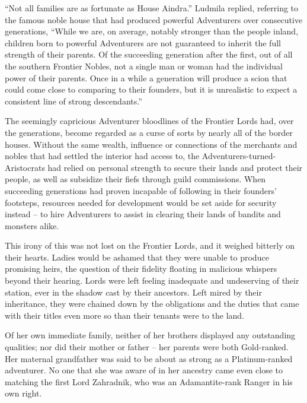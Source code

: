  

“Not all families are as fortunate as House Aindra.” Ludmila replied, referring to the famous noble house that had produced powerful Adventurers over consecutive generations, “While we are, on average, notably stronger than the people inland, children born to powerful Adventurers are not guaranteed to inherit the full strength of their parents. Of the succeeding generation after the first, out of all the southern Frontier Nobles, not a single man or woman had the individual power of their parents. Once in a while a generation will produce a scion that could come close to comparing to their founders, but it is unrealistic to expect a consistent line of strong descendants.”

 

The seemingly capricious Adventurer bloodlines of the Frontier Lords had, over the generations, become regarded as a curse of sorts by nearly all of the border houses. Without the same wealth, influence or connections of the merchants and nobles that had settled the interior had access to, the Adventurers-turned-Aristocrats had relied on personal strength to secure their lands and protect their people, as well as subsidize their fiefs through guild commissions. When succeeding generations had proven incapable of following in their founders’ footsteps, resources needed for development would be set aside for security instead – to hire Adventurers to assist in clearing their lands of bandits and monsters alike.

 

This irony of this was not lost on the Frontier Lords, and it weighed bitterly on their hearts. Ladies would be ashamed that they were unable to produce promising heirs, the question of their fidelity floating in malicious whispers beyond their hearing. Lords were left feeling inadequate and undeserving of their station, ever in the shadow cast by their ancestors. Left mired by their inheritance, they were chained down by the obligations and the duties that came with their titles even more so than their tenants were to the land.

 

Of her own immediate family, neither of her brothers displayed any outstanding qualities; nor did their mother or father – her parents were both Gold-ranked. Her maternal grandfather was said to be about as strong as a Platinum-ranked adventurer. No one that she was aware of in her ancestry came even close to matching the first Lord Zahradnik, who was an Adamantite-rank Ranger in his own right.

